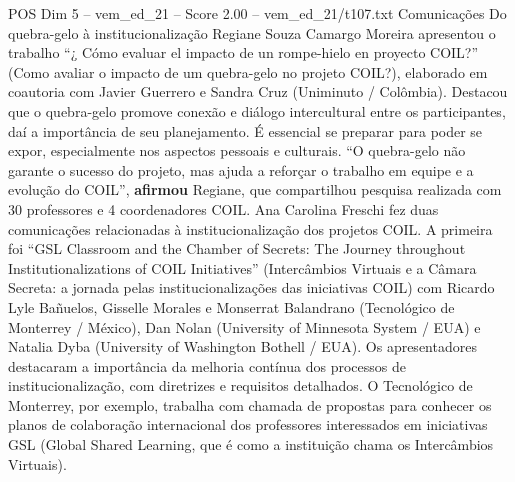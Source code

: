 \begin{textsample}{POS Dim 5 – vem\_ed\_21 – Score 2.00 – vem\_ed\_21/t107.txt}  \label{ex:f5_pos_087}
Comunicações Do quebra-gelo à institucionalização Regiane Souza Camargo Moreira apresentou o trabalho “¿ Cómo evaluar el impacto de un rompe-hielo en proyecto COIL?” (Como avaliar o impacto de um quebra-gelo no projeto COIL?), elaborado em coautoria com Javier Guerrero e Sandra Cruz (Uniminuto / Colômbia).
Destacou que o quebra-gelo promove conexão e diálogo intercultural entre os participantes, daí a importância de seu planejamento.
É essencial se preparar para poder se expor, especialmente nos aspectos pessoais e culturais. “O quebra-gelo não garante o sucesso do projeto, mas ajuda a reforçar o trabalho em equipe e a evolução do COIL”, \textbf{afirmou} Regiane, que compartilhou pesquisa realizada com 30 professores e 4 coordenadores COIL.
Ana Carolina Freschi fez duas comunicações relacionadas à institucionalização dos projetos COIL.
A primeira foi “GSL Classroom and the Chamber of Secrets: The Journey throughout Institutionalizations of COIL Initiatives” (Intercâmbios Virtuais e a Câmara Secreta: a jornada pelas institucionalizações das iniciativas COIL) com Ricardo Lyle Bañuelos, Gisselle Morales e Monserrat Balandrano (Tecnológico de Monterrey / México), Dan Nolan (University of Minnesota System / EUA) e Natalia Dyba (University of Washington Bothell / EUA).
Os apresentadores destacaram a importância da melhoria contínua dos processos de institucionalização, com diretrizes e requisitos detalhados.
O Tecnológico de Monterrey, por exemplo, trabalha com chamada de propostas para conhecer os planos de colaboração internacional dos professores interessados em iniciativas GSL (Global Shared Learning, que é como a instituição chama os Intercâmbios Virtuais).

\end{textsample}
